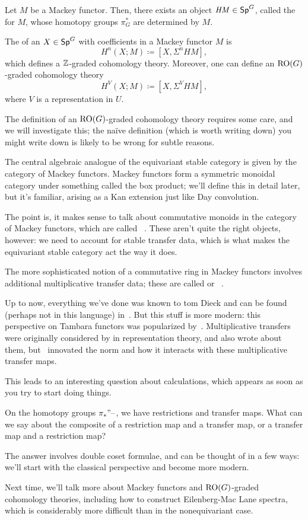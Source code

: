 Let $M$ be a Mackey functor. Then, there exists an object $\mathit{HM}\in\mathsf{Sp}^G$, called the  for $M$, whose homotopy groups $\pi_G^*$ are determined by $M$.
\begin{defn}
The  of an $X\in\mathsf{Sp}^G$ with coefficients in a Mackey functor $M$ is
\[H^n(X;M)\coloneqq [X, \Sigma^n \mathit{HM}],\]
which defines a $\mathbb Z$-graded cohomology theory. Moreover, one can define an $\mathrm{RO}(G)$-graded cohomology theory
\[H^V(X;M)\coloneqq [X, \Sigma^V \mathit{HM}],\]
where $V$ is a representation in $U$.
\end{defn}
The definition of an $\mathrm{RO}(G)$-graded cohomology theory requires some care, and we will investigate this; the naïve
definition (which is worth writing down) you might write down is likely to be wrong for subtle reasons.

The central algebraic analogue of the equivariant stable category is given by the category of Mackey functors.
Mackey functors form a symmetric monoidal category under something called the box product; we'll define this in
detail later, but it's familiar, arising as a Kan extension just like Day convolution.

The point is, it makes sense to talk about commutative monoids in the category of Mackey functors, which are called
~\cite{Green}. These aren't quite the right objects, however: we need to account for stable
transfer data, which is what makes the equivariant stable category act the way it does.

The more sophisticated notion of a commutative ring in Mackey functors involves additional multiplicative transfer
data; these are called  or ~\cite{Tambara}.

Up to now, everything we've done was known to tom Dieck and can be found (perhaps not in this language)
in~\cite{LMS}. But this stuff is more modern: this perspective on Tambara functors was popularized by~\cite{HHR}.
Multiplicative transfers were originally considered by \cite{Evens} in representation theory, and
\cite{GreenleesMay} also wrote about them, but~\cite{HHR} innovated the norm and how it interacts with these
multiplicative transfer maps.

This leads to an interesting question about calculations, which appears as soon as you try to start doing things.
\begin{ques}
On the homotopy groups $\pi_*"\text{--}$, we have restrictions and transfer maps. What can we say about the composite of
a restriction map and a transfer map, or a transfer map and a restriction map?
\end{ques}
The answer involves double coset formulae, and can be thought of in a few ways: we'll start with the classical
perspective and become more modern.

Next time, we'll talk more about Mackey functors and $\mathrm{RO}(G)$-graded cohomology theories, including how to
construct Eilenberg-Mac Lane spectra, which is considerably more difficult than in the nonequivariant case.
